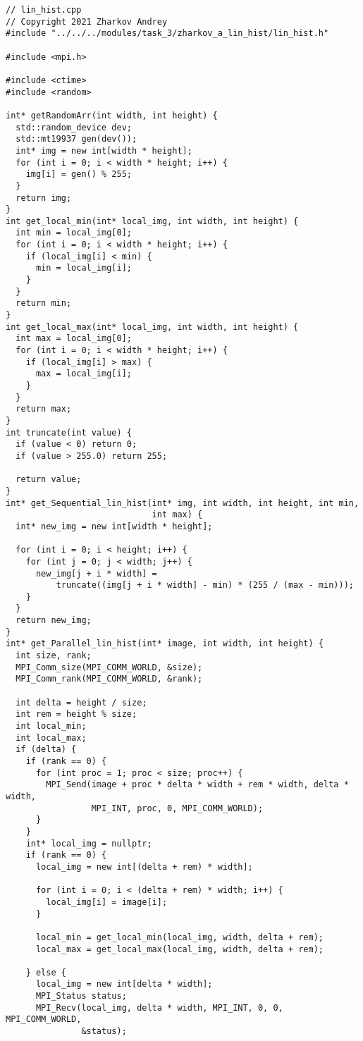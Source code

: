 \documentclass{report}
\begin{document}
\begin{lstlisting}
// lin_hist.cpp
// Copyright 2021 Zharkov Andrey
#include "../../../modules/task_3/zharkov_a_lin_hist/lin_hist.h"

#include <mpi.h>

#include <ctime>
#include <random>

int* getRandomArr(int width, int height) {
  std::random_device dev;
  std::mt19937 gen(dev());
  int* img = new int[width * height];
  for (int i = 0; i < width * height; i++) {
    img[i] = gen() % 255;
  }
  return img;
}
int get_local_min(int* local_img, int width, int height) {
  int min = local_img[0];
  for (int i = 0; i < width * height; i++) {
    if (local_img[i] < min) {
      min = local_img[i];
    }
  }
  return min;
}
int get_local_max(int* local_img, int width, int height) {
  int max = local_img[0];
  for (int i = 0; i < width * height; i++) {
    if (local_img[i] > max) {
      max = local_img[i];
    }
  }
  return max;
}
int truncate(int value) {
  if (value < 0) return 0;
  if (value > 255.0) return 255;

  return value;
}
int* get_Sequential_lin_hist(int* img, int width, int height, int min,
                             int max) {
  int* new_img = new int[width * height];

  for (int i = 0; i < height; i++) {
    for (int j = 0; j < width; j++) {
      new_img[j + i * width] =
          truncate((img[j + i * width] - min) * (255 / (max - min)));
    }
  }
  return new_img;
}
int* get_Parallel_lin_hist(int* image, int width, int height) {
  int size, rank;
  MPI_Comm_size(MPI_COMM_WORLD, &size);
  MPI_Comm_rank(MPI_COMM_WORLD, &rank);

  int delta = height / size;
  int rem = height % size;
  int local_min;
  int local_max;
  if (delta) {
    if (rank == 0) {
      for (int proc = 1; proc < size; proc++) {
        MPI_Send(image + proc * delta * width + rem * width, delta * width,
                 MPI_INT, proc, 0, MPI_COMM_WORLD);
      }
    }
    int* local_img = nullptr;
    if (rank == 0) {
      local_img = new int[(delta + rem) * width];

      for (int i = 0; i < (delta + rem) * width; i++) {
        local_img[i] = image[i];
      }

      local_min = get_local_min(local_img, width, delta + rem);
      local_max = get_local_max(local_img, width, delta + rem);

    } else {
      local_img = new int[delta * width];
      MPI_Status status;
      MPI_Recv(local_img, delta * width, MPI_INT, 0, 0, MPI_COMM_WORLD,
               &status);


\end{lstlisting}
\end{document}
